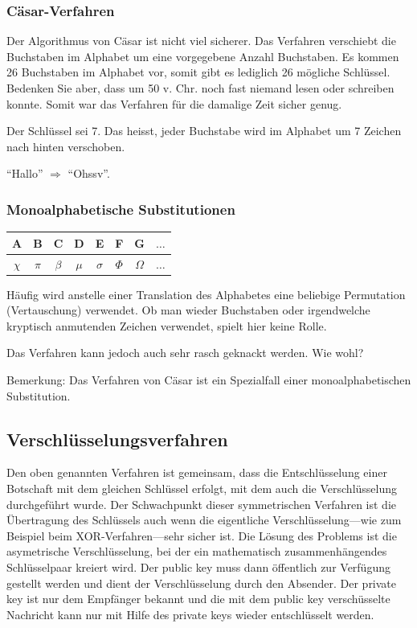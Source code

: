\subsubsection*{Cäsar-Verfahren}

Der Algorithmus von Cäsar ist nicht viel sicherer. Das Verfahren verschiebt
die Buchstaben im Alphabet um eine vorgegebene Anzahl Buchstaben. Es kommen
26 Buchstaben im Alphabet vor, somit gibt es lediglich 26 mögliche Schlüssel.
Bedenken Sie aber, dass um 50 v. Chr. noch fast niemand lesen oder schreiben konnte.
Somit war das Verfahren für die damalige Zeit sicher genug.


\begin{beispiel}[Cäsar]
    \label{ex:caesar}
    Der Schlüssel sei 7. Das heisst, jeder
    Buchstabe wird im Alphabet um 7 Zeichen nach hinten verschoben.
\end{beispiel}

``Hallo'' $\Rightarrow$ ``Ohssv''.

\subsubsection*{Monoalphabetische Substitutionen}
\label{subsubsec:monoalphabetische-substitution}

\begin{tabular}{|c|c|c|c|c|c|c|c}
    \hline
    A & B & C & D & E & F & G &  $\ldots$ \\ \hline
    $\chi$ & $\pi$ & $\beta$ & $\mu$ & $\sigma$ & $\Phi$ & $\Omega$ &  $\ldots$ \\ \hline
\end{tabular}

Häufig wird anstelle einer Translation des Alphabetes eine beliebige
Permutation (Vertauschung) verwendet. Ob man wieder Buchstaben oder
irgendwelche kryptisch anmutenden Zeichen verwendet, spielt hier keine Rolle.

Das Verfahren kann jedoch auch sehr rasch geknackt werden. Wie wohl?

Bemerkung: Das Verfahren von Cäsar ist ein Spezialfall einer
monoalphabetischen Substitution.


\subsection{Verschlüsselungsverfahren}

Den oben genannten Verfahren ist gemeinsam, dass die Entschlüsselung einer
Botschaft mit dem gleichen Schlüssel erfolgt, mit dem auch die Verschlüsselung
durchgeführt wurde. Der Schwachpunkt dieser symmetrischen Verfahren ist die
Übertragung des Schlüssels auch wenn die eigentliche Verschlüsselung---wie
zum Beispiel beim XOR-Verfahren---sehr sicher ist. Die Lösung des Problems
ist die asymetrische Verschlüsselung, bei der ein mathematisch
zusammenhängendes Schlüsselpaar kreiert wird. Der public key muss dann
öffentlich zur Verfügung gestellt werden und dient der Verschlüsselung
durch den Absender. Der private key ist nur dem Empfänger bekannt und die
mit dem public key verschüsselte Nachricht kann nur mit Hilfe des private
keys wieder entschlüsselt werden.

